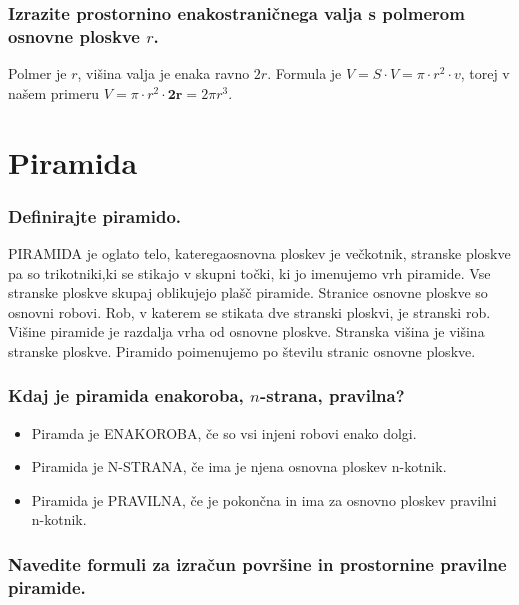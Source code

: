 \documentclass{article}
\begin{document}
\subsubsection*{Izrazite prostornino enakostraničnega valja s polmerom osnovne ploskve $r$.}

Polmer je $r$, višina valja je enaka ravno $2 r$. Formula je $V=S \cdot V=\pi \cdot r^{2} \cdot v$, torej v našem primeru $V=\pi \cdot r^{2} \cdot \mathbf{2 r}=2 \pi r^{3}$.

\section{Piramida}
\subsubsection*{Definirajte piramido.}

PIRAMIDA je oglato telo, kateregaosnovna ploskev je večkotnik, stranske ploskve pa so trikotniki,ki se stikajo v skupni točki, ki jo imenujemo vrh piramide. Vse stranske ploskve skupaj oblikujejo plašč piramide. Stranice osnovne ploskve so osnovni robovi. Rob, v katerem se stikata dve stranski ploskvi, je stranski rob. Višine piramide je razdalja vrha od osnovne ploskve. Stranska višina je višina stranske ploskve. Piramido poimenujemo po številu stranic osnovne ploskve.

\subsubsection*{Kdaj je piramida enakoroba, $n$-strana, pravilna?}

\begin{itemize}
  \item Piramda je ENAKOROBA, če so vsi injeni robovi enako dolgi.

  \item Piramida je N-STRANA, če ima je njena osnovna ploskev n-kotnik.

  \item Piramida je PRAVILNA, če je pokončna in ima za osnovno ploskev pravilni n-kotnik.

\end{itemize}

\subsubsection*{Navedite formuli za izračun površine in prostornine pravilne piramide.}
\end{document}
